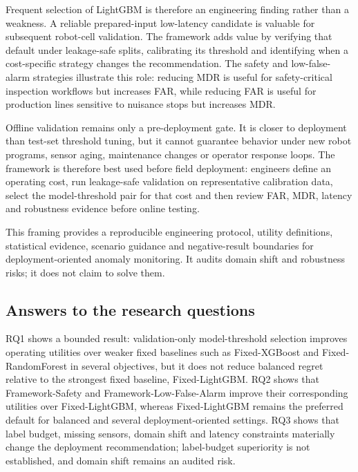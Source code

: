 Frequent selection of LightGBM is therefore an engineering finding rather than a weakness. A reliable prepared-input low-latency candidate is valuable for subsequent robot-cell validation. The framework adds value by verifying that default under leakage-safe splits, calibrating its threshold and identifying when a cost-specific strategy changes the recommendation. The safety and low-false-alarm strategies illustrate this role: reducing MDR is useful for safety-critical inspection workflows but increases FAR, while reducing FAR is useful for production lines sensitive to nuisance stops but increases MDR.

Offline validation remains only a pre-deployment gate. It is closer to deployment than test-set threshold tuning, but it cannot guarantee behavior under new robot programs, sensor aging, maintenance changes or operator response loops. The framework is therefore best used before field deployment: engineers define an operating cost, run leakage-safe validation on representative calibration data, select the model-threshold pair for that cost and then review FAR, MDR, latency and robustness evidence before online testing.

This framing provides a reproducible engineering protocol, utility definitions, statistical evidence, scenario guidance and negative-result boundaries for deployment-oriented anomaly monitoring. It audits domain shift and robustness risks; it does not claim to solve them.


\subsection{Answers to the research questions}
RQ1 shows a bounded result: validation-only model-threshold selection improves operating utilities over weaker fixed baselines such as Fixed-\allowbreak XGBoost and Fixed-\allowbreak RandomForest in several objectives, but it does not reduce balanced regret relative to the strongest fixed baseline, Fixed-\allowbreak LightGBM. RQ2 shows that Framework-\allowbreak Safety and Framework-\allowbreak Low-\allowbreak False-\allowbreak Alarm improve their corresponding utilities over Fixed-\allowbreak LightGBM, whereas Fixed-\allowbreak LightGBM remains the preferred default for balanced and several deployment-oriented settings. RQ3 shows that label budget, missing sensors, domain shift and latency constraints materially change the deployment recommendation; label-budget superiority is not established, and domain shift remains an audited risk.


